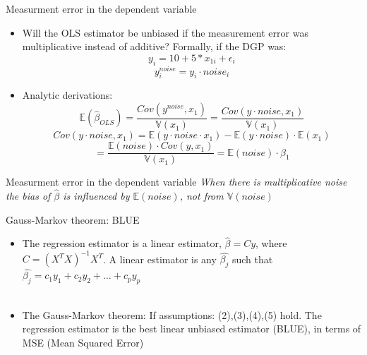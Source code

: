 \documentclass[handout]{beamer}
\begin{document}
\begin{frame}[fragile]{Measurment error in the dependent variable}
\begin{itemize}
\item Will the OLS estimator be unbiased if the measurement error was multiplicative instead of additive? Formally, if the DGP was:
\[ y_i = 10+5*x_{1i}+\epsilon_i \]
\[ y_i^{noise} = y_i \cdot noise_i \] \pause
\item Analytic derivations:
\[
\mathbb{E}(\hat{\beta}_{OLS}) = \frac{Cov(y^{noise},x_1)}{\mathbb{V}(x_1)} 
 = \frac{Cov(y \cdot noise,x_1)}{\mathbb{V}(x_1)}\] 
\pause
\[ Cov (y \cdot noise,x_1) = \mathbb{E}(y \cdot noise \cdot x_1) - 
\mathbb{E}(y \cdot noise) \cdot \mathbb{E}(x_1) \]
\[ = \frac{\mathbb{E}(noise) \cdot Cov(y,x_1)}{\mathbb{V}(x_1)}
 =  \mathbb{E}(noise) \cdot \beta_1\] 
\end{itemize}
\end{frame}

\begin{frame}[fragile]{Measurment error in the dependent variable}
\textit{When there is multiplicative noise the bias of $\hat{\beta}$ is influenced by $\mathbb{E}(noise)$, not from $\mathbb{V}(noise)$}

\end{frame}



\begin{frame}{Gauss-Markov theorem: BLUE}
\begin{itemize}
\item The regression estimator is a linear estimator, $\hat{\beta} = Cy$, where $C = (X^T X)^{-1}X^T$. A linear estimator is any $\hat{\beta_j}$ such that 
$\hat{\beta_j} = c_1y_1+c_2y_2+\dots+c_py_p$ \\~\\

\item The Gauss-Markov theorem: If assumptions: (2),(3),(4),(5) hold. The regression estimator is the best linear unbiased estimator (BLUE), in terms of MSE (Mean Squared Error)  
\end{itemize}
\end{frame}
\end{document}
